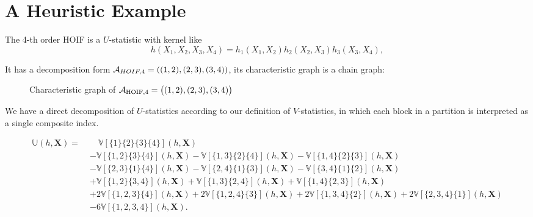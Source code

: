 \documentclass[letterpaper,11pt]{article}
\newcommand{\ustat}{\mathbb{U}}
\newcommand{\vstat}{\mathbb{V}}
\begin{document}
\section{A Heuristic Example}




The 4-th order HOIF is a $U$-statistic with kernel like
\begin{equation*}
    h(X_1,X_2,X_3,X_4) = h_1(X_1,X_2)h_2(X_2,X_3)h_3(X_3,X_4), 
\end{equation*}

It has a decomposition form ${\mathcal{A}}_{HOIF,4} = ( (1,2), (2,3), (3, 4) )$, its characteristic graph is a chain graph:

\begin{figure}[h]
\centering
{}
\caption{Characteristic graph of ${\mathcal{A}}_{\text{HOIF},4} = \big( (1,2), (2,3), (3,4) \big)$}
\end{figure}

We have a direct decomposition of $U$-statistics according to our definition of $V$-statistics, in which each block in a partition is interpreted as a single composite index.

\begin{align*}
\ustat(h, \bm{X}) = \; & 
\hspace{1em}
\vstat[\{1\}\{2\}\{3\}\{4\}](h, \bm{X}) \\
& 
- \vstat[\{1,2\}\{3\}\{4\}](h, \bm{X})
- \vstat[\{1,3\}\{2\}\{4\}](h, \bm{X})
- \vstat[\{1,4\}\{2\}\{3\}](h, \bm{X}) \\
& 
- \vstat[\{2,3\}\{1\}\{4\}](h, \bm{X})
- \vstat[\{2,4\}\{1\}\{3\}](h, \bm{X})
- \vstat[\{3,4\}\{1\}\{2\}](h, \bm{X}) \\
& 
+ \vstat[\{1,2\}\{3,4\}](h, \bm{X})
+ \vstat[\{1,3\}\{2,4\}](h, \bm{X})
+ \vstat[\{1,4\}\{2,3\}](h, \bm{X}) \\
& 
+ 2\vstat[\{1,2,3\}\{4\}](h, \bm{X})
+ 2\vstat[\{1,2,4\}\{3\}](h, \bm{X})
+ 2\vstat[\{1,3,4\}\{2\}](h, \bm{X})
+ 2\vstat[\{2,3,4\}\{1\}](h, \bm{X}) \\
& 
- 6\vstat[\{1,2,3,4\}](h, \bm{X}).
\end{align*}
\end{document}
